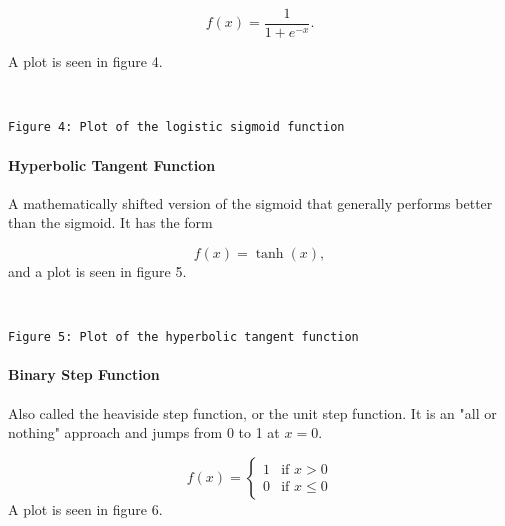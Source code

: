 \documentclass[11pt]{article}
\begin{document}
\[
f(x) = \frac{1}{1 + e^{-x}}.
\] 

A plot is seen in figure 4.

    \begin{center}
    \end{center}
    { \hspace*{\fill} \\}
    
    \begin{Verbatim}[commandchars=\\\{\}]
Figure 4: Plot of the logistic sigmoid function
    \end{Verbatim}

    \hypertarget{hyperbolic-tangent-function}{%
\paragraph{Hyperbolic Tangent
Function}\label{hyperbolic-tangent-function}}

A mathematically shifted version of the sigmoid that generally performs
better than the sigmoid. It has the form

\[
f(x) = \tanh(x),
\] and a plot is seen in figure 5.


    \begin{center}
    \end{center}
    { \hspace*{\fill} \\}
    
    \begin{Verbatim}[commandchars=\\\{\}]
Figure 5: Plot of the hyperbolic tangent function
    \end{Verbatim}

    \hypertarget{binary-step-function}{%
\paragraph{Binary Step Function}\label{binary-step-function}}

Also called the heaviside step function, or the unit step function. It
is an "all or nothing" approach and jumps from 0 to 1 at \(x=0\).

\[
f(x) =
\left\{
    \begin{array}{ll}
        1  & \mbox{if } x > 0 \\
        0 & \mbox{if } x \leq 0
    \end{array}
\right.
\] 
A plot is seen in figure 6.
\end{document}
